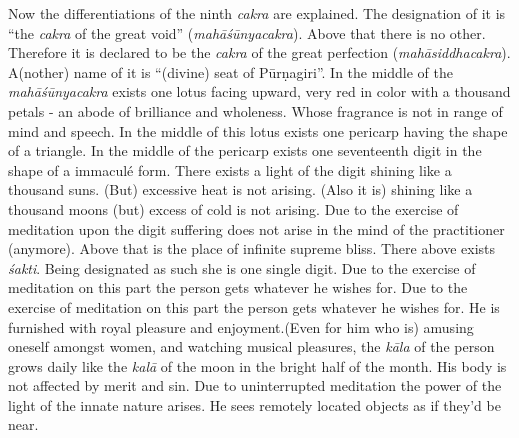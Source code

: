 \documentclass[11pt,showtrims]{memoir}
\begin{document}
Now the differentiations of the ninth \textit{cakra} are explained. The designation of it is ``the \textit{cakra} of the great void'' (\textit{mahāśūnyacakra}). Above that there is no other. Therefore it is declared to be the \textit{cakra} of the great perfection (\textit{mahāsiddhacakra}). A(nother) name of it is ``(divine) seat of Pūrṇagiri''. In the middle of the \textit{mahāśūnyacakra} exists one lotus facing upward, very red in color with a thousand petals - an abode of brilliance and wholeness. Whose fragrance is not in range of mind and speech. In the middle of this lotus exists one pericarp having the shape of a triangle. In the middle of the pericarp exists one seventeenth digit in the shape of a immaculé form. There exists a light of the digit shining like a thousand suns. (But) excessive heat is not arising. (Also it is) shining like a thousand moons (but) excess of cold is not arising. Due to the exercise of meditation upon the digit suffering does not arise in the mind of the practitioner (anymore). Above that is the place of infinite supreme bliss. There above exists \textit{śakti}. Being designated as such she is one single digit. Due to the exercise of meditation on this part the person gets whatever he wishes for. Due to the exercise of meditation on this part the person gets whatever he wishes for. He is furnished with royal pleasure and enjoyment.(Even for him who is) amusing oneself amongst women, and watching musical pleasures, the \textit{kāla} of the person grows daily like the \textit{kalā} of the moon in the bright half of the month. His body is not affected by merit and sin. Due to uninterrupted meditation the power of the light of the innate nature arises. He sees remotely located objects as if they'd be near. 
\endnumbering
\end{document}
